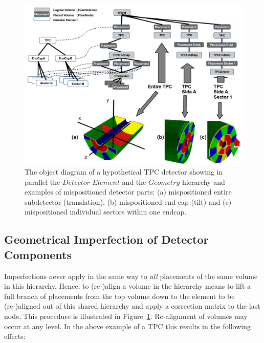 \documentclass[10pt,a4paper]{article}
\begin{document}
\begin{figure}[h]
  \begin{center}
    \includegraphics[width=160mm] {DDAlign_detelement_aligned_tree.png}
    \caption{The object diagram of a hypothetical TPC detector showing in
    parallel the $Detector$ $Element$ and the $Geometry$ hierarchy and examples
    of mispositioned detector parts: (a) mispositioned entire subdetector 
    (translation), (b) mispositioned end-cap (tilt) and (c) mispositioned
    individual sectors within one endcap.}
    \label{fig:dd4hep-aligned-hierarchies}
  \end{center}
\end{figure}
\subsection{Geometrical Imperfection of Detector Components}
\label{subsect:ddalign-intro-aligments}
\noindent
Imperfections never apply in the same way to {\it{all}} placements of the 
same volume in this hierarchy. Hence, to (re-)align a volume in the hierarchy
means to lift a full branch of placements from the top volume down to
the element to be (re-)aligned out of this shared hierarchy and apply
a correction matrix to the last node. This procedure is illustrated in 
Figure~\ref{fig:dd4hep-aligned-hierarchies}. Re-alignment of volumes may occur
at any level. In the above example of a TPC this results in the following effects:
\end{document}

